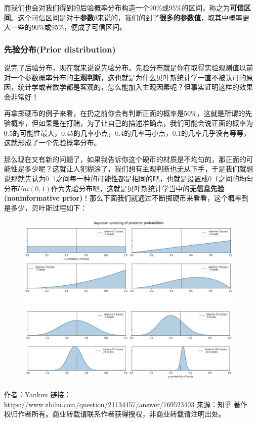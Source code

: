 \documentclass[12pt]{article}
\begin{document}
而我们也会对我们得到的后验概率分布构造一个90\%或95\%的区间，称之为\textbf{可信区间}。这个可信区间是对于\textbf{参数}$\theta$来说的，我们的到了\textbf{很多的参数值}，取其中概率更大一些的90\%或95\%，便成了可信区间。

\subsubsection{先验分布(Prior distribution)}
说完了后验分布，现在就来说说先验分布。先验分布就是你在取得实验观测值以前对一个参数概率分布的\textbf{主观判断}，这也就是为什么贝叶斯统计学一直不被认可的原因，统计学或者数学都是客观的，怎么能加入主观因素呢？但事实证明这样的效果会非常好！

再拿掷硬币的例子来看，在扔之前你会有判断正面的概率是50\%，这就是所谓的先验概率，但如果是在打赌，为了让自己的描述准确点，我们可能会说正面的概率为0.5的可能性最大，0.45的几率小点，0.4的几率再小点，0.1的几率几乎没有等等，这就形成了一个先验概率分布。

那么现在又有新的问题了，如果我告诉你这个硬币的材质是不均匀的，那正面的可能性是多少呢？这就让人犯糊涂了，我们想有主观判断也无从下手，于是我们就想说那就先认为0~1之间每一种的可能性都是相同的吧，也就是设置成0~1之间的均匀分布$Uni(0,1)$作为先验分布吧，这就是贝叶斯统计学当中的\textbf{无信息先验(noninformative prior)}！那么下面我们就通过不断掷硬币来看看，这个概率到是多少，贝叶斯过程如下：
\begin{figure}[H]
    \centering
    \includegraphics[width=1\textwidth]{fig/Bayesian_Example_4.png}
\end{figure}

作者：Yankun
链接：https://www.zhihu.com/question/21134457/answer/169523403
来源：知乎
著作权归作者所有。商业转载请联系作者获得授权，非商业转载请注明出处。
\end{document}
